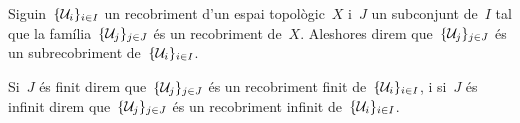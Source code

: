 \documentclass[../topologia.tex]{subfiles}
\begin{document}
    \begin{definition}[Subrecobriment]
        \label{def:subrecobriment}
        \label{def:subrecobriment-finit}
        \label{def:subrecobriment-infinit}
        Siguin~\(\{\mathcal{U}_{i}\}_{i\in I}\) un recobriment d'un espai topològic~\(X\) i~\(J\) un subconjunt de~\(I\) tal que la família~\(\{\mathcal{U}_{j}\}_{j\in J}\) és un recobriment de~\(X\).
        Aleshores direm que~\(\{\mathcal{U}_{j}\}_{j\in J}\) és un subrecobriment de~\(\{\mathcal{U}_{i}\}_{i\in I}\).

        Si~\(J\) és finit direm que~\(\{\mathcal{U}_{j}\}_{j\in J}\) és un recobriment finit de~\(\{\mathcal{U}_{i}\}_{i\in I}\), i si~\(J\) és infinit direm que~\(\{\mathcal{U}_{j}\}_{j\in J}\) és un recobriment infinit de~\(\{\mathcal{U}_{i}\}_{i\in I}\).
    \end{definition}
\end{document}
